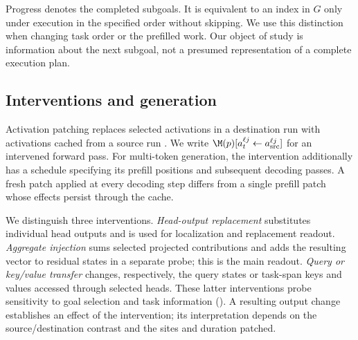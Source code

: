 Progress denotes the completed subgoals. It is equivalent to an index in $G$ only under execution in the specified order without skipping. We use this distinction when changing task order or the prefilled work. Our object of study is information about the next subgoal, not a presumed representation of a complete execution plan.

\subsection{Interventions and generation}
\label{sec:notations:interventions}
Activation patching replaces selected activations in a destination run with activations cached from a source run \citep{vig-etal-2020,mueller2026quest}. We write $\M(p)[a_t^{\ell j}\leftarrow a_{\mathrm{src}}^{\ell j}]$ for an intervened forward pass. For multi-token generation, the intervention additionally has a schedule specifying its prefill positions and subsequent decoding passes. A fresh patch applied at every decoding step differs from a single prefill patch whose effects persist through the cache.

We distinguish three interventions. \emph{Head-output replacement} substitutes individual head outputs and is used for localization and replacement readout. \emph{Aggregate injection} sums selected projected contributions and adds the resulting vector to residual states in a separate probe; this is the main \goalscope readout. \emph{Query or key/value transfer} changes, respectively, the query states or task-span keys and values accessed through selected heads. These latter interventions probe sensitivity to goal selection and task information (). A resulting output change establishes an effect of the intervention; its interpretation depends on the source/destination contrast and the sites and duration patched.
